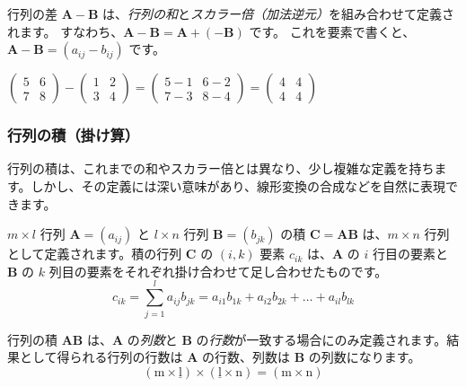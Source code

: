 行列の差 $\bm{A} - \bm{B}$ は、\emph{行列の和}と\emph{スカラー倍（加法逆元）}を組み合わせて定義されます。
すなわち、$\bm{A} - \bm{B} = \bm{A} + (-\bm{B})$ です。
これを要素で書くと、$\bm{A} - \bm{B} = (a_{ij} - b_{ij})$ です。

\begin{ex}
$\begin{pmatrix} 5 & 6 \\ 7 & 8 \end{pmatrix} - \begin{pmatrix} 1 & 2 \\ 3 & 4 \end{pmatrix} = \begin{pmatrix} 5-1 & 6-2 \\ 7-3 & 8-4 \end{pmatrix} = \begin{pmatrix} 4 & 4 \\ 4 & 4 \end{pmatrix}$
\end{ex}

\subsubsection{行列の積（掛け算）}

行列の積は、これまでの和やスカラー倍とは異なり、少し複雑な定義を持ちます。しかし、その定義には深い意味があり、線形変換の合成などを自然に表現できます。

\begin{dfn}[行列の積] \label{matrix_product}
$m \times l$ 行列 $\bm{A} = (a_{ij})$ と $l \times n$ 行列 $\bm{B} = (b_{jk})$ の積 $\bm{C} = \bm{A}\bm{B}$ は、$m \times n$ 行列として定義されます。積の行列 $\bm{C}$ の $(i,k)$ 要素 $c_{ik}$ は、$\bm{A}$ の $i$ 行目の要素と $\bm{B}$ の $k$ 列目の要素をそれぞれ掛け合わせて足し合わせたものです。
\[c_{ik} = \sum_{j=1}^{l} a_{ij} b_{jk} = a_{i1}b_{1k} + a_{i2}b_{2k} + \dots + a_{il}b_{lk}\]
\end{dfn}

\begin{rmk*}
行列の積 $\bm{A}\bm{B}$ は、$\bm{A}$ の\emph{列数}と $\bm{B}$ の\emph{行数}が一致する場合にのみ定義されます。結果として得られる行列の行数は $\bm{A}$ の行数、列数は $\bm{B}$ の列数になります。
\[(\text{m} \times \underline{\text{l}}) \times (\underline{\text{l}} \times \text{n}) = (\text{m} \times \text{n})\]
\end{rmk*}

